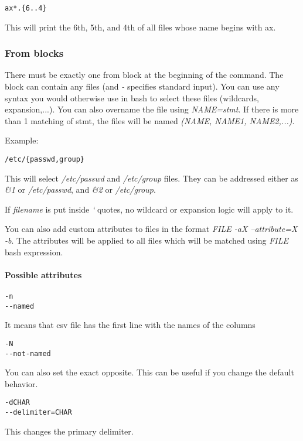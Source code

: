 \begin{verbatim}
ax*.{6..4}
\end{verbatim}
This will print the 6th, 5th, and 4th of all files whose name begins with ax.

\subsubsection{From blocks}
There must be exactly one from block at the beginning of the command. 
The block can contain any files (and \textit{-} specifies standard input). 
You can use any syntax you would otherwise use in bash to select these files (wildcards, expansion,...)\break\cite{bash-reference-manual}. 
You can also overname the file using \textit{NAME=stmt}. If there is more than 1 matching of stmt, the files will be named \textit{(NAME, NAME1, NAME2,...)}.

Example:
\begin{verbatim}
/etc/{passwd,group}
\end{verbatim}

This will select \textit{/etc/passwd} and \textit{/etc/group} files. They can be addressed either as \textit{\&1} or \textit{/etc/passwd}, and \textit{\&2} or \textit{/etc/group}.

If \textit{filename} is put inside \textit{`} quotes, no wildcard or expansion logic will apply to it.

You can also add custom attributes to files in the format \break \textit{FILE -aX --attribute=X -b}. The attributes will be applied to all files which will be matched using \textit{FILE} bash expression.

\paragraph{Possible attributes}

\begin{verbatim}
-n
--named
\end{verbatim}
It means that csv file has the first line with the names of the columns

\begin{verbatim}
-N
--not-named
\end{verbatim}
You can also set the exact opposite. This can be useful if you change the default behavior.

\begin{verbatim}
-dCHAR
--delimiter=CHAR
\end{verbatim}
This changes the primary delimiter.

